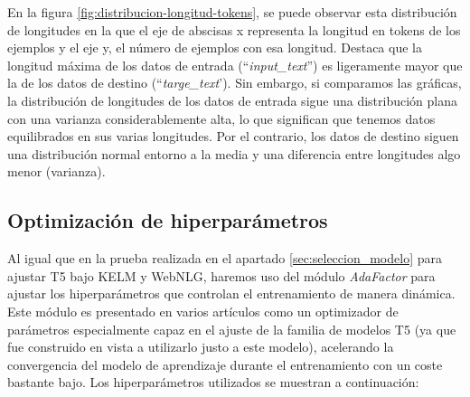 En la figura \ref{fig:distribucion-longitud-tokens}, se puede observar esta distribución de longitudes en la que el eje de abscisas x representa la longitud en tokens de los ejemplos y el eje y, el número de ejemplos con esa longitud. Destaca que la longitud máxima de los datos de entrada (``\textit{input\_text}'') es ligeramente mayor que la de los datos de destino (``\textit{targe\_text}'). Sin embargo, si comparamos las gráficas, la distribución de longitudes de los datos de entrada sigue una distribución plana con una varianza considerablemente alta, lo que significan que tenemos datos equilibrados en sus varias longitudes. Por el contrario, los datos de destino siguen una distribución normal entorno a la media y una diferencia entre longitudes algo menor (varianza).


\subsection{Optimización de hiperparámetros}
Al igual que en la prueba realizada en el apartado \ref{sec:seleccion_modelo} para ajustar T5 bajo KELM y WebNLG, haremos uso del módulo \textit{AdaFactor} \citep{shazeer2018adafactor} para ajustar los hiperparámetros que controlan el entrenamiento de manera dinámica. Este módulo es presentado en varios artículos como un optimizador de parámetros especialmente capaz en el ajuste de la familia de modelos T5 (ya que fue construido en vista a utilizarlo justo a este modelo), acelerando la convergencia del modelo de aprendizaje durante el entrenamiento con un coste bastante bajo. Los hiperparámetros utilizados se muestran a continuación:

